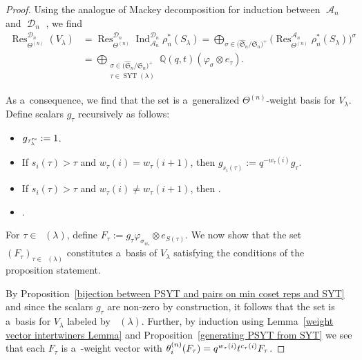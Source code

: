 \documentclass[10pt,a4paper]{amsart}
\numberwithin{equation}{section}
\theoremstyle{definition}
\DeclareMathOperator{\SYT}{\mathrm{SYT}}
\DeclareMathOperator{\PSYT}{\mathrm{PSYT}_{\geq 0}}
\DeclareMathOperator{\sA}{\mathscr{A}}
\DeclareMathOperator{\sD}{\mathscr{D}}
\DeclareMathOperator{\Ind}{Ind}
\DeclareMathOperator{\Res}{Res}
\begin{document}
\begin{proof}
 Using the analogue of Mackey decomposition for induction between $\sA_n$ and $\sD_n$ \cite[Proposition~3.9.5]{CherednikBook}, we find
 \begin{align*}
 \Res_{\Theta^{(n)}}^{\sD_n}(V_{\lambda}) &= \Res_{\Theta^{(n)}}^{\sD_n} \Ind_{\sA_n}^{\sD_n} \rho_n^{*}(S_{\lambda})
 = \bigoplus_{\sigma \in \bigl( \widehat{\mathfrak{S}}_n/\mathfrak{S}_n \bigr)^{+}} \bigl( \Res_{\Theta^{(n)}}^{\sA_n} \rho_n^{*}(S_{\lambda}) \bigr)^{\sigma} \\
 &= \bigoplus_{\substack{\sigma \in \bigl( \widehat{\mathfrak{S}}_n/\mathfrak{S}_n \bigr)^{+}\\ \tau \in \SYT(\lambda)}} \mathbb{Q}(q,t) (\varphi_{\sigma}\otimes e_{\tau}).
 \end{align*}

 As a~consequence, we find that the set \smash{$\{\varphi_{\sigma}\otimes e_{\tau}\}_{(\sigma,\tau) \in ( \widehat{\mathfrak{S}}_n/\mathfrak{S}_n )^{+} \times \SYT(\lambda)}$} is a~generalized $\Theta^{(n)}$-weight basis for $V_{\lambda}$. Define scalars $g_{\tau}$ recursively as follows:
 \begin{itemize}
\itemsep=0pt
 \item $g_{\tau_{\lambda}^{\rm rs}}:= 1$.
 \item If $s_i(\tau)> \tau$ and $w_{\tau}(i) = w_{\tau}(i+1)$, then $g_{s_i(\tau)}:= q^{-w_{\tau}(i)}g_{\tau}$.
 \item If $s_i(\tau) > \tau$ and $w_{\tau}(i)\neq w_{\tau}(i+1)$, then .
 \item {}.
 \end{itemize}
 For $\tau \in \PSYT(\lambda)$, define $F_{\tau} := g_{\tau} \varphi_{\sigma_{w_{\tau}}} \otimes e_{S(\tau)}$. We now show that the set $(F_{\tau})_{\tau \in \PSYT(\lambda)}$ constitutes a~basis of $V_{\lambda}$ satisfying the conditions of the proposition statement.

 By Proposition~\ref{bijection between PSYT and pairs on min coset reps and SYT} and since the scalars $g_{\tau}$ are non-zero by construction, it follows that the set \smash{$(F_{\tau})_{\tau \in \PSYT(\lambda)}$} is a~basis for $V_{\lambda}$ labeled by $\PSYT(\lambda)$. Further, by induction using Lemma~\ref{weight vector intertwiners Lemma} and Proposition~\ref{generating PSYT from SYT} we see that each $F_{\tau}$ is a~-weight vector with $\smash{\theta_i^{(n)}(F_{\tau})} = q^{w_{\tau}(i)}t^{c_{\tau}(i)}F_{\tau}$.


\end{proof}
\end{document}
